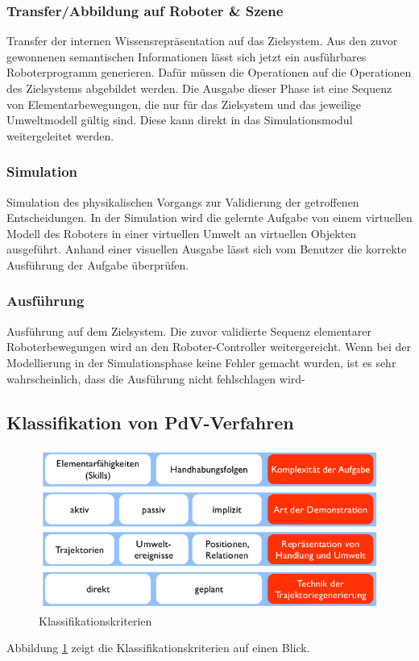 \subsubsection*{Transfer/Abbildung auf Roboter \& Szene}
Transfer der internen Wissensrepräsentation auf das Zielsystem. Aus den zuvor gewonnenen semantischen Informationen lässt sich jetzt ein ausführbares Roboterprogramm generieren. Dafür müssen die Operationen auf die Operationen des Zielsystems abgebildet werden. Die Ausgabe dieser Phase ist eine Sequenz von Elementarbewegungen, die nur für das Zielsystem und das jeweilige Umweltmodell gültig sind. Diese kann direkt in das Simulationsmodul weitergeleitet werden.
\subsubsection*{Simulation}
Simulation des physikalischen Vorgangs zur Validierung der getroffenen Entscheidungen. In der Simulation wird die gelernte Aufgabe von einem virtuellen Modell des Roboters in einer virtuellen Umwelt an virtuellen Objekten ausgeführt. Anhand einer visuellen Ausgabe lässt sich vom Benutzer die korrekte Ausführung der Aufgabe überprüfen. 
\subsubsection*{Ausführung}
Ausführung auf dem Zielsystem. Die zuvor validierte Sequenz elementarer Roboterbewegungen wird an den Roboter-Controller weitergereicht. Wenn bei der Modellierung in der Simulationsphase keine Fehler gemacht wurden, ist es sehr wahrscheinlich, dass die Ausführung nicht fehlschlagen wird-

\subsection{Klassifikation von PdV-Verfahren}
\begin{figure}[ht]\centering 
\includegraphics[width=0.6\linewidth]{figures/ch03_kriterien.png}
\caption{Klassifikationskriterien}
\label{fig:ch03_krit}
\end{figure}
Abbildung  \ref{fig:ch03_krit} zeigt die Klassifikationskriterien auf einen Blick.
